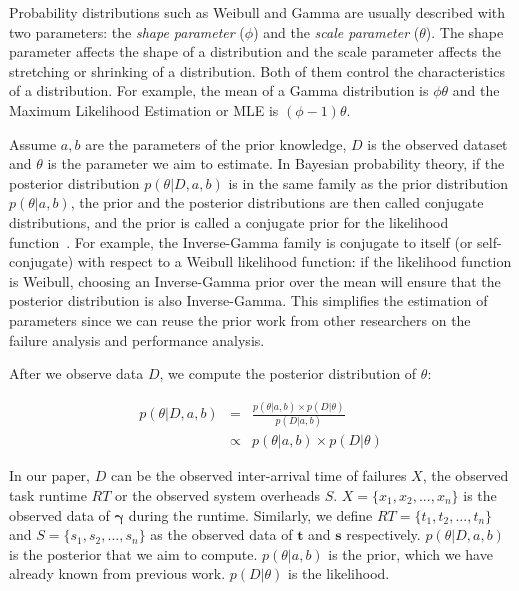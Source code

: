 \documentclass{IOS-Book-Article}
\begin{document}
Probability distributions such as Weibull and Gamma are usually described with two parameters: the \emph{shape parameter} ($\phi$) and the \emph{scale parameter} ($\theta$). The shape parameter affects the shape of a distribution and the scale parameter affects the stretching or shrinking of a distribution. Both of them control the characteristics of a distribution. For example, the mean of a Gamma distribution is $\phi\theta$ and the Maximum Likelihood Estimation or MLE is $(\phi-1)\theta$. 

Assume $a,b$ are the parameters of the prior knowledge, $D$ is the observed dataset and $\theta$ is the parameter we aim to estimate. In Bayesian probability theory, if the posterior distribution $p(\theta|D, a, b)$ is in the same family as the prior distribution $p(\theta|a, b)$, the prior and the posterior distributions are then called conjugate distributions, and the prior is called a conjugate prior for the likelihood function~\cite{diaconis1979conjugate}. For example, the Inverse-Gamma family is conjugate to itself (or self-conjugate) with respect to a Weibull likelihood function: if the likelihood function is Weibull, choosing an Inverse-Gamma prior over the mean will ensure that the posterior distribution is also Inverse-Gamma. This simplifies the estimation of parameters since we can reuse the prior work from other researchers \cite{Schroeder2006, Iosup2008, Sun2003, Chen2011} on the failure analysis and performance analysis. 

After we observe data $D$, we compute the posterior distribution of $\theta$:

\begin{eqnarray}
	\displaystyle  
	p(\theta|D, a, b)&=&\frac{p(\theta|a, b)\times p(D|\theta)}{p(D|a, b)}\nonumber  \\
	&\propto&p(\theta|a, b)\times p(D|\theta)\nonumber 
\end{eqnarray}

In our paper, $D$ can be the observed inter-arrival time of failures $X$, the observed task runtime $RT$ or the observed system overheads $S$. 
$X=\{x_1, x_2, ..., x_n\}$ is the observed data of $\bm\gamma$ during the runtime. Similarly, we define $RT=\{t_1, t_2, ..., t_n\}$ and $S=\{s_1, s_2, ..., s_n\}$ as the observed data of $\bm t$ and $\bm s$ respectively. $p(\theta|D,a, b)$ is the posterior that we aim to compute. $p(\theta|a, b)$ is the prior, which we have already known from previous work. $p(D|\theta)$ is the likelihood. 
\end{document}
